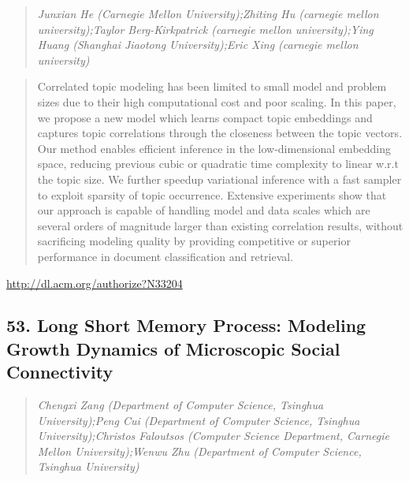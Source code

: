 \documentclass{article}
\begin{document}
\begin{quote}
\footnotesize{\textit{Junxian He (Carnegie Mellon University);Zhiting Hu (carnegie mellon university);Taylor Berg-Kirkpatrick (carnegie mellon university);Ying Huang (Shanghai Jiaotong University);Eric Xing (carnegie mellon university)}}

\end{quote}

\begin{quote}
Correlated topic modeling has been limited to small model and problem sizes due to their high computational cost and poor scaling. In this paper, we propose a new model which learns compact topic embeddings and captures topic correlations through the closeness between the topic vectors. Our method enables efficient inference in the low-dimensional embedding space, reducing previous cubic or quadratic time complexity to linear w.r.t the topic size. We further speedup variational inference with a fast sampler to exploit sparsity of topic occurrence. Extensive experiments show that our approach is capable of handling model and data scales which are several orders of magnitude larger than existing correlation results, without sacrificing modeling quality by providing competitive or superior performance in document classification and retrieval.
\end{quote}

\href{http://dl.acm.org/authorize?N33204}{http://dl.acm.org/authorize?N33204}

\subsection{53. Long Short Memory Process: Modeling Growth Dynamics of Microscopic Social Connectivity}

\begin{quote}
\footnotesize{\textit{Chengxi Zang (Department of Computer Science, Tsinghua University);Peng Cui (Department of Computer Science, Tsinghua University);Christos Faloutsos (Computer Science Department, Carnegie Mellon University);Wenwu Zhu (Department of Computer Science, Tsinghua University)}}

\end{quote}
\end{document}
